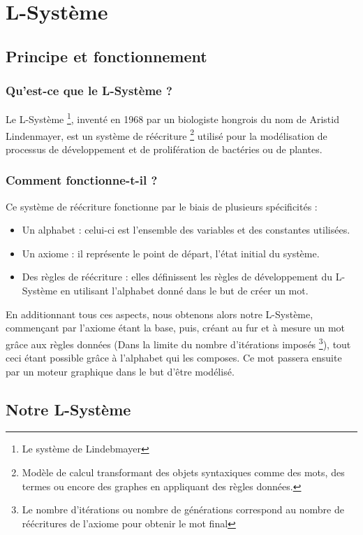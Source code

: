 \chapter{L-Système}

\section{Principe et fonctionnement}

\subsection{Qu'est-ce que le L-Système ?}
Le L-Système \footnote{Le système de Lindebmayer}, inventé en 1968 par un biologiste hongrois du nom de Aristid Lindenmayer, est un système de réécriture \footnote{Modèle de calcul transformant des objets syntaxiques comme des mots, des termes ou encore des graphes en appliquant des règles données.} utilisé pour la modélisation de processus de développement et de prolifération de bactéries ou de plantes.

\subsection{Comment fonctionne-t-il ?}
Ce système de réécriture fonctionne par le biais de plusieurs spécificités :
\begin{itemize}
    \item Un alphabet : celui-ci est l'ensemble des variables et des constantes utilisées.
    \item Un axiome : il représente le point de départ, l'état initial du système.
    \item Des règles de réécriture : elles définissent les règles de développement du L-Système en utilisant l'alphabet donné dans le but de créer un mot.
\end{itemize}
En additionnant tous ces aspects, nous obtenons alors notre L-Système, commençant par l'axiome étant la base, puis, créant au fur et à mesure un mot grâce aux règles données (Dans la limite du nombre d'itérations imposés \footnote{Le nombre d'itérations ou nombre de générations correspond au nombre de réécritures de l'axiome pour obtenir le mot final}), tout ceci étant possible grâce à l'alphabet qui les composes.
Ce mot passera ensuite par un moteur graphique dans le but d'être modélisé.

\section{Notre L-Système}

